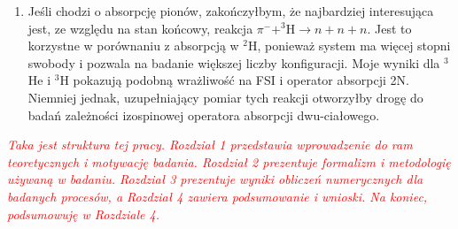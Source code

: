 \documentclass[a4paper, 14pt]{extarticle}
\providecommand{\tmp}[1]
{
\textcolor{red}{\textit{#1}}
}
\begin{document}
\begin{enumerate}
\item Jeśli chodzi o absorpcj\k{e} pion\'ow, zakończy\l{}bym, \.ze najbardziej interesuj\k{a}ca jest, ze wzgl\k{e}du na stan końcowy,
reakcja $\pi^- + ^3\text{H} \rightarrow n + n + n$.
Jest to korzystne w por\'ownaniu z absorpcj\k{a} w $^2$H, poniewa\.z system ma wi\k{e}cej stopni swobody i pozwala
na badanie wi\k{e}kszej liczby konfiguracji.
Moje wyniki dla $^3$He i $^3$H pokazuj\k{a} podobn\k{a} wra\.zliwoś\'c na FSI i operator absorpcji 2N. Niemniej jednak, uzupe\l{}niaj\k{a}cy pomiar tych reakcji otworzy\l{}by drog\k{e} do badań zale\.zności izospinowej operatora absorpcji dwu-cia\l{}owego.
\end{enumerate}

\tmp{Taka jest struktura tej pracy. Rozdzia\l{} 1 przedstawia wprowadzenie do ram teoretycznych i motywacj\k{e} badania. Rozdzia\l{} 2 prezentuje formalizm i metodologi\k{e} u\.zywan\k{a} w badaniu. Rozdzia\l{} 3 prezentuje wyniki obliczeń numerycznych dla badanych proces\'ow, a Rozdzia\l{} 4 zawiera podsumowanie i wnioski.
Na koniec, podsumowuj\k{e} w Rozdziale 4.}
\end{document}
